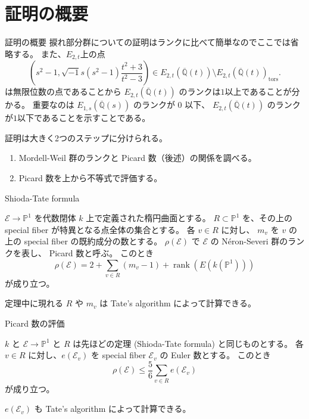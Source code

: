 \documentclass{classes/mybeamer}
\DeclareMathOperator{\rank}{rank}
\newcommand{\Neron}{N\'eron}
\begin{document}
\section{証明の概要}
\begin{frame}{証明の概要}
    捩れ部分群についての証明はランクに比べて簡単なのでここでは省略する。
    また、$E_{2,t}$上の点
    \begin{equation*}
        \left(s^{2} - 1, \sqrt{-1} s(s^{2} - 1) \frac{t^{2} + 3}{t^{2} - 3} \right) \in E_{2,t}(\overline{\mathbb{Q}}(t)) \setminus E_{2,t}(\overline{\mathbb{Q}}(t))_{\text{tors}}.
    \end{equation*}
    は無限位数の点であることから $E_{2,t}(\overline{\mathbb{Q}}(t))$ のランクは$1$以上であることが分かる。
    重要なのは $E_{1,s}(\overline{\mathbb{Q}}(s))$ のランクが $0$ 以下、 $ E_{2,t}(\overline{\mathbb{Q}}(t))$ のランクが$1$以下であることを示すことである。
    \vspace{1em}

    証明は大きく2つのステップに分けられる。
    \begin{enumerate}
        \item Mordell-Weil 群のランクと Picard 数（後述）の関係を調べる。
        \item Picard 数を上から不等式で評価する。
    \end{enumerate}
\end{frame}

\begin{frame}{Shioda-Tate formula}
    \begin{thm}
        \label{thm:shioda}
        $\mathcal{E} \to \mathbb{P}^1$ を代数閉体 $k$ 上で定義された楕円曲面とする。
        $R \subset \mathbb{P}^1$ を、その上の special fiber が特異となる点全体の集合とする。
        各 $v \in R$ に対し、 $m_{v}$ を $v$ の上の special fiber の既約成分の数とする。
        $\rho(\mathcal{E})$ で $\mathcal{E}$ の \Neron-Severi 群のランクを表し、 Picard 数と呼ぶ。
        このとき
        \begin{equation*}
            \rho (\mathcal{E}) = 2 + \sum_{v \in R} (m_{v} - 1) + \rank(E(k(\mathbb{P}^1)))
        \end{equation*}
        が成り立つ。
    \end{thm}
    定理中に現れる $R$ や $m_v$ は Tate's algorithm によって計算できる。
\end{frame}

\begin{frame}{Picard 数の評価}
    \begin{proposition}
        $k$ と $\mathcal{E} \to \mathbb{P}^1$ と $R$ は先ほどの定理 (Shioda-Tate formula) と同じものとする。
        各 $v \in R$ に対し、$e(\mathcal{E}_v)$ を special fiber $\mathcal{E}_v$ の Euler 数とする。
        このとき
        \begin{equation*}
            \rho(\mathcal{E}) \leq \frac{5}{6} \sum_{v \in R} e(\mathcal{E}_v)
        \end{equation*}
        が成り立つ。
    \end{proposition}
    $e(\mathcal{E}_v)$ も Tate's algorithm によって計算できる。
\end{frame}
\end{document}
